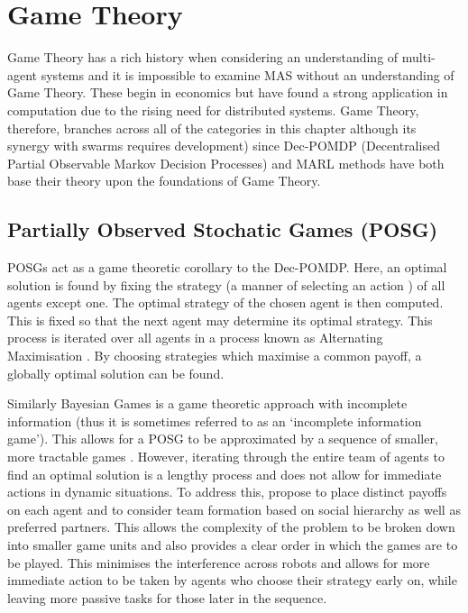 \documentclass[.../main.tex]{subfiles}
\begin{document}
\section{Game Theory} \label{sec::Game_Theory}

Game Theory has a rich history when considering an understanding of multi-agent systems and it is
impossible to examine MAS without an understanding of Game Theory. These begin in economics but have
found a strong application in computation due to the rising need for distributed systems. Game
Theory, therefore, branches across all of the categories in this chapter although its synergy with
swarms requires development) since Dec-POMDP (Decentralised Partial Observable Markov Decision
Processes) and MARL methods have both base their theory upon the foundations of Game Theory.

\subsection{Partially Observed Stochatic Games (POSG)} \label{sec::Stochastic_Games}

POSGs act as a game theoretic corollary to the Dec-POMDP. Here, an optimal solution is found by
fixing the strategy (a manner of selecting an action \cite{Rizk2018}) of all agents
except one. The optimal strategy of the chosen agent is then computed. This is fixed so that the
next agent may determine its optimal strategy. This process is iterated over all agents in a process
known as Alternating Maximisation \cite{Ray2010}. By choosing strategies which maximise
a common payoff, a globally optimal solution can be found.

Similarly Bayesian Games is a game theoretic approach with incomplete information (thus it is
sometimes referred to as an `incomplete information game’). This allows for a POSG to be
approximated by a sequence of smaller, more tractable games
\cite{Emery-Montemerlo}. However, iterating through the entire team of agents to
find an optimal solution is a lengthy process and does not allow for immediate actions in dynamic
situations. To address this, \cite{Ray2010} propose to place distinct payoffs on each
agent and to consider team formation based on social hierarchy as well as preferred partners. This
allows the complexity of the problem to be broken down into smaller game units and also provides a
clear order in which the games are to be played. This minimises the interference across robots and
allows for more immediate action to be taken by agents who choose their strategy early on, while
leaving more passive tasks for those later in the sequence. 
\end{document}
